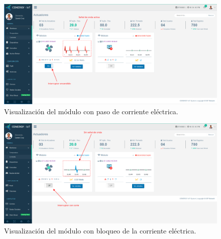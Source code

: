 \begin{landscape} %
\begin{figure}[htpb]
\centering 
\includegraphics[width=1.7\textwidth]{./Figures/test/consumo/actuador1.png}
\caption{Visualización del módulo con paso de corriente eléctrica.}
\label{fig:dashboard-v1}
\end{figure}
\end{landscape} %
\begin{landscape} %
\begin{figure}[htpb]
\centering 
\includegraphics[width=1.7\textwidth]{./Figures/test/consumo/actuador2.png}
\caption{Visualización del módulo con bloqueo de la corriente eléctrica.}
\label{fig:dashboard-v2}
\end{figure}
\end{landscape} %
